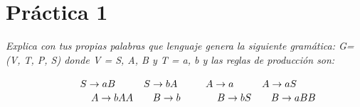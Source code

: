 



\maketitle %
\newpage %
\tableofcontents %
\listoffigures
\newpage
\section{Práctica 1}
\textit{Explica con tus propias palabras que lenguaje genera la siguiente gramática: \newline
G=(V, T, P, S) donde V = {S, A, B} y T = {a, b} y las reglas de producción son:\vspace{2em}}

$ \hspace*{2.6cm}S\rightarrow aB \hspace{1cm} S\rightarrow bA  \hspace{1cm} A\rightarrow a\hspace{1cm}  A\rightarrow aS $\newline
$\hspace*{3cm} A\rightarrow bAA  \hspace{0.7cm} B\rightarrow b \hspace{1.3cm} B\rightarrow bS  \hspace{0.7cm} B\rightarrow aBB $\vspace{2em}

